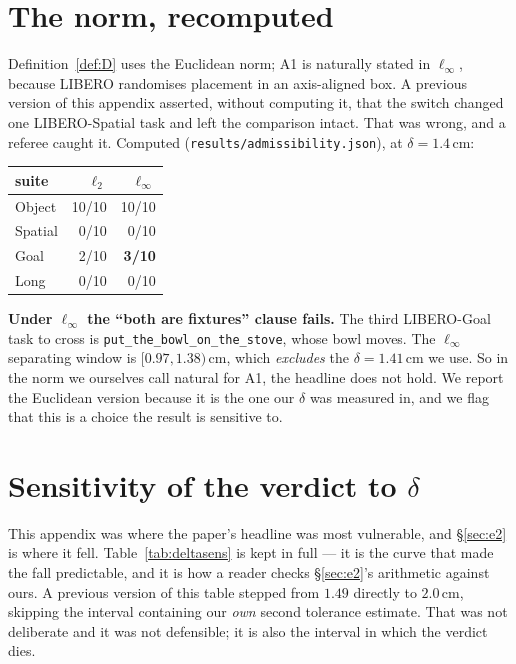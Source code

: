 \documentclass[10pt,twocolumn]{article}
\begin{document}
\section{The norm, recomputed}
\label{sec:norm}

Definition~\ref{def:D} uses the Euclidean norm; A1 is naturally stated in
$\ell_\infty$, because LIBERO randomises placement in an axis-aligned box. A
previous version of this appendix asserted, without computing it, that the
switch changed one LIBERO-Spatial task and left the comparison intact. That was
wrong, and a referee caught it. Computed
(\texttt{results/admissibility.json}), at $\delta = 1.4$\,cm:

\begin{center}\footnotesize
\begin{tabular}{lrr}
\toprule
suite & $\ell_2$ & $\ell_\infty$ \\
\midrule
Object & 10/10 & 10/10 \\
Spatial & 0/10 & 0/10 \\
Goal & 2/10 & \textbf{3/10} \\
Long & 0/10 & 0/10 \\
\bottomrule
\end{tabular}
\end{center}

\noindent \textbf{Under $\ell_\infty$ the ``both are fixtures'' clause fails.}
The third LIBERO-Goal task to cross is \texttt{put\_the\_bowl\_on\_the\_stove},
whose bowl moves. The $\ell_\infty$ separating window is
$[0.97, 1.38)$\,cm, which \emph{excludes} the $\delta = 1.41$\,cm we use. So in
the norm we ourselves call natural for A1, the headline does not hold. We
report the Euclidean version because it is the one our $\delta$ was measured
in, and we flag that this is a choice the result is sensitive to.

\section{Sensitivity of the verdict to $\delta$}
\label{app:deltasens}

This appendix was where the paper's headline was most vulnerable, and
\S\ref{sec:e2} is where it fell. Table~\ref{tab:deltasens} is kept in full ---
it is the curve that made the fall predictable, and it is how a reader checks
\S\ref{sec:e2}'s arithmetic against ours. A previous version of this table
stepped from $1.49$ directly to $2.0$\,cm, skipping the interval containing our
\emph{own} second tolerance estimate. That was not deliberate and it was not
defensible; it is also the interval in which the verdict dies.
\end{document}
